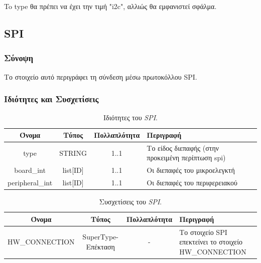 \noindent To type θα πρέπει να έχει την τιμή "i2c", αλλιώς θα εμφανιστεί σφάλμα.

\subsection{SPI}
\label{subsec:spi_con}

\subsubsection*{Σύνοψη}

\noindent Το στοιχείο αυτό περιγράφει τη σύνδεση μέσω πρωτοκόλλου SPI.

\subsubsection*{Ιδιότητες και Συσχετίσεις}

\begin{table}[H]
	\begin{center}
		\caption{Ιδιότητες του \textit{SPI}.}
		\label{tab:spi_con1}
		\begin{tabular}{ | c | c | c| m{5.5cm} | }
			\hline
			\rowcolor{Gray}
			Όνομα & Τύπος & Πολλαπλότητα & Περιγραφή \\
			\hline
			type & STRING & 1..1 & Το είδος διεπαφής (στην προκειμένη περίπτωση spi) \\
			\hline
			board\_int & list[ID] & 1..1 & Οι διεπαφές του μικροελεγκτή \\
			\hline
			peripheral\_int & list[ID] & 1..1 & Οι διεπαφές του περιφερειακού \\
			\hline
		\end{tabular}
	\end{center}
\end{table}

\begin{table}[H]
	\begin{center}
		\caption{Συσχετίσεις του \textit{SPI}.}
		\label{tab:spi_con2}
		\begin{tabular}{ | c | c | c| m{5.5cm} | }
			\hline
			\rowcolor{Gray}
			Όνομα & Τύπος & Πολλαπλότητα & Περιγραφή \\
			\hline
			\footnotesize{HW\_CONNECTION} & SuperType-Επέκταση & - &  Το στοιχείο SPI επεκτείνει το στοιχείο HW\_CONNECTION \\
			\hline
		\end{tabular}
	\end{center}
\end{table}

